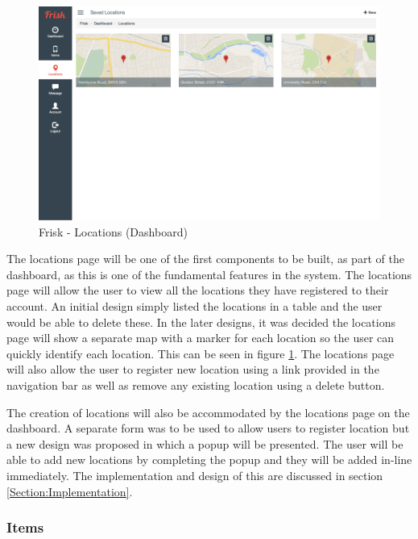 \begin{figure}[H]
	\centering
	\includegraphics[width=1.0\textwidth]{images/Frisk/Dashboard_Locations}
	\caption{Frisk - Locations (Dashboard)} \label{fig:Dashboard_Locations}
\end{figure}

The locations page will be one of the first components to be built, as part of the dashboard, as this is one of the fundamental features in the system. The locations page will allow the user to view all the locations they have registered to their account. An initial design simply listed the locations in a table and the user would be able to delete these. In the later designs, it was decided the locations page will show a separate map with a marker for each location so the user can quickly identify each location. This can be seen in figure \ref{fig:Dashboard_Locations}. The locations page will also allow the user to register new location using a link provided in the navigation bar as well as remove any existing location using a delete button.

The creation of locations will also be accommodated by the locations page on the dashboard. A separate form was to be used to allow users to register location but a new design was proposed in which a popup will be presented. The user will be able to add new locations by completing the popup and they will be added in-line immediately. The implementation and design of this are discussed in section \ref{Section:Implementation}.

\subsubsection{Items}


